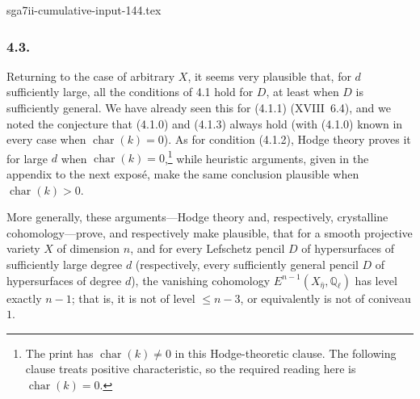 \begin{filecontents*}{sga7ii-cumulative-input-144.tex}
\subsubsection*{4.3.}
Returning to the case of arbitrary $X$, it seems very plausible that, for
$d$ sufficiently large, all the conditions of 4.1 hold for $D$, at least
when $D$ is sufficiently general.  We have already seen this for (4.1.1)
(XVIII~6.4), and we noted the conjecture that (4.1.0) and (4.1.3) always
hold (with (4.1.0) known in every case when $\operatorname{char}(k)=0$).
As for condition (4.1.2), Hodge theory proves it for large $d$ when
$\operatorname{char}(k)=0$,\footnote{The print has
$\operatorname{char}(k)\ne0$ in this Hodge-theoretic clause.  The following
clause treats positive characteristic, so the required reading here is
$\operatorname{char}(k)=0$.} while heuristic arguments, given in the
appendix to the next exposé, make the same conclusion plausible when
$\operatorname{char}(k)>0$.

More generally, these arguments---Hodge theory and, respectively,
crystalline cohomology---prove, and respectively make plausible, that for
a smooth projective variety $X$ of dimension $n$, and for every Lefschetz
pencil $D$ of hypersurfaces of sufficiently large degree $d$ (respectively,
every sufficiently general pencil $D$ of hypersurfaces of degree $d$), the
vanishing cohomology
$E^{n-1}(X_{\bar\eta},\mathbb Q_\ell)$ has level exactly $n-1$; that is, it
is not of level $\leq n-3$, or equivalently is not of coniveau $1$.
\end{filecontents*}

